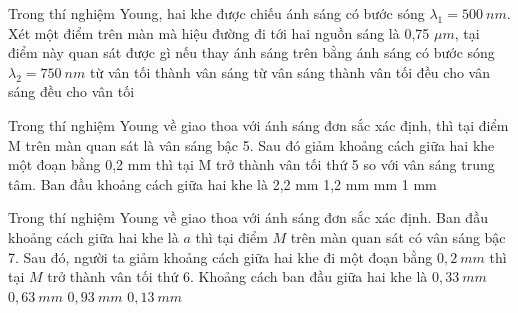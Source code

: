 \begin{ex}%
Trong thí nghiệm Young, hai khe được chiếu ánh sáng có bước sóng ${{\lambda}_{1}}=500\ nm $. Xét một điểm trên màn mà hiệu đường đi tới hai nguồn sáng là 0,75 $\mu m $, tại điểm này quan sát được gì nếu thay ánh sáng trên bằng ánh sáng có bước sóng ${{\lambda}_{2}}=750\ nm $
\choice
{\True từ vân tối thành vân sáng}
{từ vân sáng thành vân tối}
{đều cho vân sáng}
{đều cho vân tối}
\end{ex} 
\begin{ex}%
Trong thí nghiệm Young về giao thoa với ánh sáng đơn sắc xác định, thì tại điểm M trên màn quan sát là vân sáng bậc 5. Sau đó giảm khoảng cách giữa hai khe một đoạn bằng 0,2 mm thì tại M trở thành vân tối thứ 5 so với vân sáng trung tâm. Ban đầu khoảng cách giữa hai khe là
\choice
{2,2 mm}
{1,2 mm}
{ mm}
{1 mm}

\end{ex} 
\begin{ex}
Trong thí nghiệm Young về giao thoa với ánh sáng đơn sắc xác định. Ban đầu khoảng cách giữa hai khe là $a$ thì tại điểm $M$ trên màn quan sát có vân sáng bậc 7. Sau đó, người ta giảm khoảng cách giữa hai khe đi một đoạn bằng $0,2\ mm$ thì tại $M$ trở thành vân tối thứ 6. Khoảng cách ban đầu giữa hai khe là 
\choice
{$0,33\ mm$}
{$0,63\ mm$}
{\True $0,93\ mm$}
{$0,13\ mm$}
\loigiai{ }
\end{ex}
